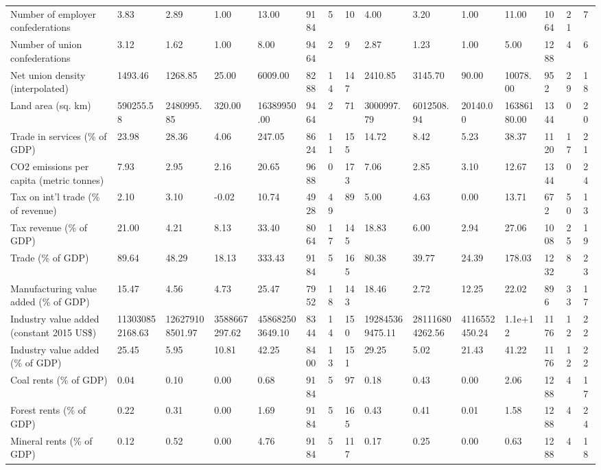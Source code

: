 \begin{longtable}{lllllllllllllll}
Number of employer confederations & 3.83 & 2.89 & 1.00 & 13.00 & 9184 & 5 & 10 & 4.00 & 3.20 & 1.00 & 11.00 & 1064 & 21 & 7\\
Number of union confederations & 3.12 & 1.62 & 1.00 & 8.00 & 9464 & 2 & 9 & 2.87 & 1.23 & 1.00 & 5.00 & 1288 & 4 & 6\\
Net union density (interpolated) & 1493.46 & 1268.85 & 25.00 & 6009.00 & 8288 & 14 & 147 & 2410.85 & 3145.70 & 90.00 & 10078.00 & 952 & 29 & 18\\
Land area (sq. km) & 590255.58 & 2480995.85 & 320.00 & 16389950.00 & 9464 & 2 & 71 & 3000997.79 & 6012508.94 & 20140.00 & 16386180.00 & 1344 & 0 & 20\\
Trade in services (\% of GDP) & 23.98 & 28.36 & 4.06 & 247.05 & 8624 & 11 & 155 & 14.72 & 8.42 & 5.23 & 38.37 & 1120 & 17 & 21\\
\addlinespace
CO2 emissions per capita (metric tonnes) & 7.93 & 2.95 & 2.16 & 20.65 & 9688 & 0 & 173 & 7.06 & 2.85 & 3.10 & 12.67 & 1344 & 0 & 24\\
Tax on int'l trade (\% of revenue) & 2.10 & 3.10 & -0.02 & 10.74 & 4928 & 49 & 89 & 5.00 & 4.63 & 0.00 & 13.71 & 672 & 50 & 13\\
Tax revenue (\% of GDP) & 21.00 & 4.21 & 8.13 & 33.40 & 8064 & 17 & 145 & 18.83 & 6.00 & 2.94 & 27.06 & 1008 & 25 & 19\\
Trade (\% of GDP) & 89.64 & 48.29 & 18.13 & 333.43 & 9184 & 5 & 165 & 80.38 & 39.77 & 24.39 & 178.03 & 1232 & 8 & 23\\
Manufacturing value added (\% of GDP) & 15.47 & 4.56 & 4.73 & 25.47 & 7952 & 18 & 143 & 18.46 & 2.72 & 12.25 & 22.02 & 896 & 33 & 17\\
\addlinespace
Industry value added (constant 2015 US\$) & 113030852168.63 & 126279108501.97 & 3588667297.62 & 458682503649.10 & 8344 & 14 & 150 & 192845369475.11 & 281116804262.56 & 4116552450.24 & 1.1e+12 & 1176 & 12 & 22\\
Industry value added (\% of GDP) & 25.45 & 5.95 & 10.81 & 42.25 & 8400 & 13 & 151 & 29.25 & 5.02 & 21.43 & 41.22 & 1176 & 12 & 22\\
Coal rents (\% of GDP) & 0.04 & 0.10 & 0.00 & 0.68 & 9184 & 5 & 97 & 0.18 & 0.43 & 0.00 & 2.06 & 1288 & 4 & 17\\
Forest rents (\% of GDP) & 0.22 & 0.31 & 0.00 & 1.69 & 9184 & 5 & 165 & 0.43 & 0.41 & 0.01 & 1.58 & 1288 & 4 & 24\\
Mineral rents (\% of GDP) & 0.12 & 0.52 & 0.00 & 4.76 & 9184 & 5 & 117 & 0.17 & 0.25 & 0.00 & 0.63 & 1288 & 4 & 18\\

\end{longtable}
